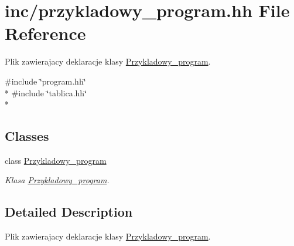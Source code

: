 \hypertarget{przykladowy__program_8hh}{\section{inc/przykladowy\+\_\+program.hh File Reference}
\label{przykladowy__program_8hh}
}


Plik zawierajacy deklaracje klasy \hyperlink{class_przykladowy__program}{Przykladowy\+\_\+program}.  


{\ttfamily \#include \char`\"{}program.\+hh\char`\"{}}\\*
{\ttfamily \#include \char`\"{}tablica.\+hh\char`\"{}}\\*
\subsection*{Classes}
\begin{DoxyCompactItemize}
\item 
class \hyperlink{class_przykladowy__program}{Przykladowy\+\_\+program}
\begin{DoxyCompactList}\small\item\em Klasa \hyperlink{class_przykladowy__program}{Przykladowy\+\_\+program}. \end{DoxyCompactList}\end{DoxyCompactItemize}


\subsection{Detailed Description}
Plik zawierajacy deklaracje klasy \hyperlink{class_przykladowy__program}{Przykladowy\+\_\+program}. 

